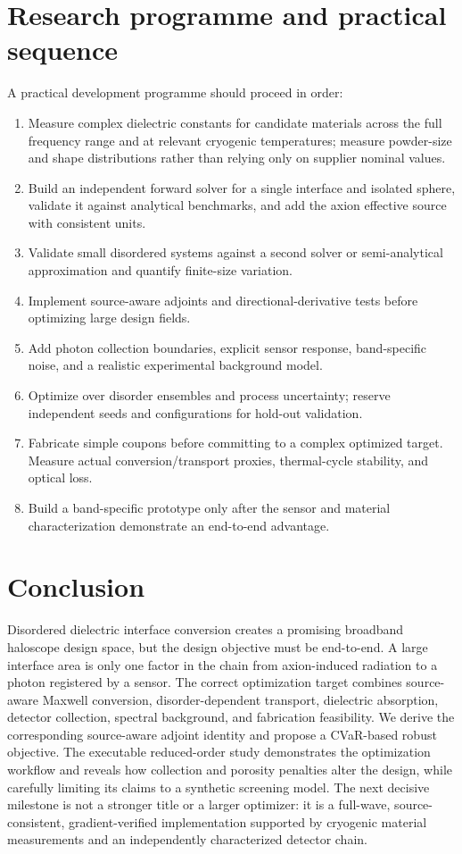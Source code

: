 \documentclass[10.5pt,a4paper]{article}
\begin{document}
\section{Research programme and practical sequence}
A practical development programme should proceed in order:
\begin{enumerate}
\item Measure complex dielectric constants for candidate materials across the full frequency range and at relevant cryogenic temperatures; measure powder-size and shape distributions rather than relying only on supplier nominal values.
\item Build an independent forward solver for a single interface and isolated sphere, validate it against analytical benchmarks, and add the axion effective source with consistent units.
\item Validate small disordered systems against a second solver or semi-analytical approximation and quantify finite-size variation.
\item Implement source-aware adjoints and directional-derivative tests before optimizing large design fields.
\item Add photon collection boundaries, explicit sensor response, band-specific noise, and a realistic experimental background model.
\item Optimize over disorder ensembles and process uncertainty; reserve independent seeds and configurations for hold-out validation.
\item Fabricate simple coupons before committing to a complex optimized target. Measure actual conversion/transport proxies, thermal-cycle stability, and optical loss.
\item Build a band-specific prototype only after the sensor and material characterization demonstrate an end-to-end advantage.
\end{enumerate}

\section{Conclusion}
Disordered dielectric interface conversion creates a promising broadband haloscope design space, but the design objective must be end-to-end. A large interface area is only one factor in the chain from axion-induced radiation to a photon registered by a sensor. The correct optimization target combines source-aware Maxwell conversion, disorder-dependent transport, dielectric absorption, detector collection, spectral background, and fabrication feasibility. We derive the corresponding source-aware adjoint identity and propose a CVaR-based robust objective. The executable reduced-order study demonstrates the optimization workflow and reveals how collection and porosity penalties alter the design, while carefully limiting its claims to a synthetic screening model. The next decisive milestone is not a stronger title or a larger optimizer: it is a full-wave, source-consistent, gradient-verified implementation supported by cryogenic material measurements and an independently characterized detector chain.
\end{document}
